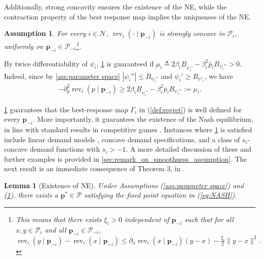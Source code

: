 \documentclass{article} %
\def\eqref#1{equation~\ref{#1}}
\renewcommand{\eqref}[1]{(\ref{#1})}
\newtheorem{assumption}[theorem]{Assumption}
\newtheorem{lemma}[theorem]{Lemma}
\begin{document}
Additionally, strong concavity ensures the existence of the NE, while the contraction property of the best response map implies the uniqueness of the NE.

\begin{assumption}\label{strong-concavity-rev}
For every $i \in \mathcal{N}$, $\operatorname{rev}_i(\cdot \mid \mathbf{p}_{-i})$ is strongly concave in $\mathcal{P}_i$, uniformly on $\mathbf{p}_{-i}\in \mathcal{P}_{-i}$\footnote{This means that there exists $\xi_i>0$ independent of $\mathbf{p}_{-i}$ such that for all $x,y\in\mathcal{P}_i$ and all
$\mathbf{p}_{-i} \in \mathcal{P}_{-i}$, $\operatorname{rev}_i(y \mid \mathbf{p}_{-i})
-
\operatorname{rev}_i(x \mid \mathbf{p}_{-i})\leq \partial_{x}\operatorname{rev}_i(x \mid \mathbf{p}_{-i})( y-x)
-\frac{\xi_i}{2} \|y-x\|^2.$}.
\end{assumption}

By twice differentiability of $\psi_i$, \cref{strong-concavity-rev} is guaranteed if $\mu_i \triangleq 2\beta_i\underline{B}_{\psi_i'} - \beta_i^2 \bar{p}_i B_{\psi_i''}>0$. Indeed, since by \cref{ass:parameter space} $|\psi_i''|\leq B_{\psi_i''}$ and $\psi_i' \geq B_{\psi'_i}$, we have
$$
\begin{aligned}
-\partial_{p}^2 \operatorname{rev}_i(p \mid \mathbf{p}_{-i}) 
\geq 2\beta_i\underline{B}_{\psi_i'} - \beta_i^2 \bar{p}_i B_{\psi_i''} := \mu_i.
\end{aligned}
$$

\cref{strong-concavity-rev} guarantees that the best-response map $\Gamma_i$ in \eqref{def:regret} is well defined for every $\mathbf{p}_{-i}$. More importantly, it guarantees the existence of the Nash equilibrium, in line with standard results in competitive games \citep{scutari2014real, li2024lego, tsekrekos2024variational}. Instances where \cref{strong-concavity-rev} is satisfied include linear demand models \citep{li2024lego}, concave demand specifications, and a class of $s_i$-concave demand functions with $s_i > - 1$. A more detailed discussion of these and further examples is provided in \cref{sec:remark_on_smoothness_assumption}.  
The next result is an immediate consequence of Theorem 3, in \cite{scutari2014real}.

\begin{lemma}[Existence of NE]\label{prof:EUNE}
Under Assumptions \eqref{ass:parameter space} and \eqref{strong-concavity-rev}, there exists a $\mathbf{p}^* \in \mathcal{P}$ satisfying the fixed point equation in \eqref{eq:NASH}.
\end{lemma}
\end{document}
